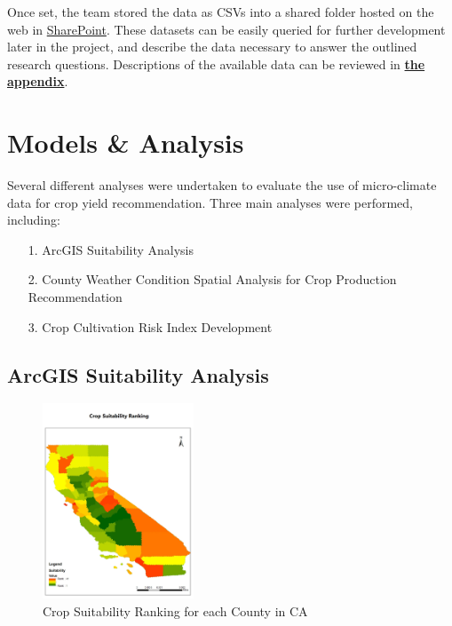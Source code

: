 \documentclass{article}
\begin{document}
Once set, the team stored the data as CSVs into a shared folder hosted on the web in \href{https://gtvault.sharepoint.com/:f:/s/MGT-6203Team95/Ev1dI-WU521EnSnFGUY9QigBHe4nMzpq5NIJo9s6VWLIoA?e=qEVO1C}{SharePoint}. These datasets can be easily queried for further development later in the project, and describe the data necessary to answer the outlined research questions. Descriptions of the available data can be reviewed in \textbf{\hyperref[sec:curated]{the appendix}}.


\section{Models \& Analysis}
\label{sec:ma}
Several different analyses were undertaken to evaluate the use of micro-climate data for crop yield recommendation. Three main analyses were performed, including:
\begin{itemize}[noitemsep]
    \item[1.] ArcGIS Suitability Analysis
    \item[2.] County Weather Condition Spatial Analysis for Crop Production Recommendation
    \item[3.] Crop Cultivation Risk Index Development
\end{itemize}

\subsection{ArcGIS Suitability Analysis} 
\label{sec:suitability} 

\begin{figure}
  \vspace{-10pt} %
  \centering
  \includegraphics[width=0.4\textwidth]{Final_Report/images/Crop Suitability Ranking.jpg}
  \centering
  \caption{Crop Suitability Ranking for each County in CA}
  \label{sec:SuitabilityAnalysis}
  \vspace{-2pt} %
\end{figure}
\end{document}
